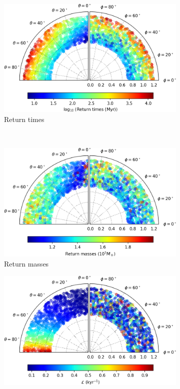 \begin{figure}[h]
    \centering
    \begin{subfigure}[t]{0.4\textwidth}
        \includegraphics[width = \textwidth]{"../Files/Week 13/images/3_time"}
        \caption{Return times}
    \end{subfigure}
    ~ 
    \begin{subfigure}[t]{0.4\textwidth}
        \includegraphics[width=\textwidth]{"../Files/Week 13/images/3_mass"}
        \caption{Return masses}
    \end{subfigure}
    \begin{subfigure}[t]{0.4\textwidth}
        \includegraphics[width=\textwidth]{"../Files/Week 13/images/3_lyapunov"}

\end{subfigure}
\end{figure}
